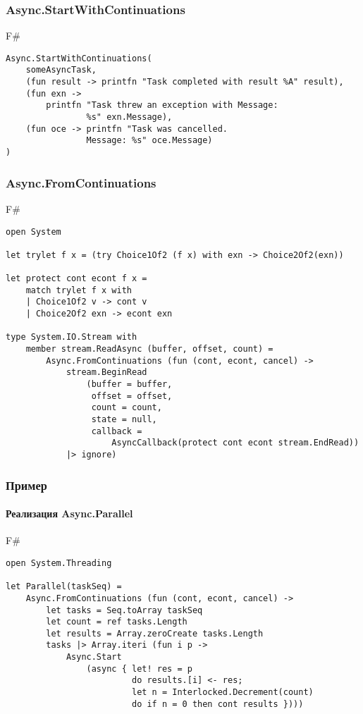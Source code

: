 \documentclass[xetex,mathserif,serif]{beamer}
\begin{document}
	\begin{frame}[fragile]
		\frametitle{Async.StartWithContinuations}
		\begin{exampleblock}{F\#}
			\begin{verbatim}
Async.StartWithContinuations(
    someAsyncTask,
    (fun result -> printfn "Task completed with result %A" result),
    (fun exn -> 
        printfn "Task threw an exception with Message: 
                %s" exn.Message),
    (fun oce -> printfn "Task was cancelled. 
                Message: %s" oce.Message)
)
		\end{verbatim}
		\end{exampleblock}
\end{frame}

	\begin{frame}[fragile]
		\frametitle{Async.FromContinuations}
		\begin{scriptsize}
			\begin{exampleblock}{F\#}
				\begin{verbatim}
open System

let trylet f x = (try Choice1Of2 (f x) with exn -> Choice2Of2(exn))

let protect cont econt f x =
    match trylet f x with
    | Choice1Of2 v -> cont v
    | Choice2Of2 exn -> econt exn

type System.IO.Stream with
    member stream.ReadAsync (buffer, offset, count) =
        Async.FromContinuations (fun (cont, econt, cancel) ->
            stream.BeginRead
                (buffer = buffer,
                 offset = offset,
                 count = count,
                 state = null,
                 callback = 
                     AsyncCallback(protect cont econt stream.EndRead))
            |> ignore)
				\end{verbatim}
			\end{exampleblock}
		\end{scriptsize}
\end{frame}

	\begin{frame}[fragile]
		\frametitle{Пример}
		\framesubtitle{Реализация Async.Parallel}
		\begin{exampleblock}{F\#}
			\begin{verbatim}
open System.Threading

let Parallel(taskSeq) =
    Async.FromContinuations (fun (cont, econt, cancel) ->
        let tasks = Seq.toArray taskSeq
        let count = ref tasks.Length
        let results = Array.zeroCreate tasks.Length
        tasks |> Array.iteri (fun i p ->
            Async.Start
                (async { let! res = p
                         do results.[i] <- res;
                         let n = Interlocked.Decrement(count)
                         do if n = 0 then cont results })))
			\end{verbatim}
		\end{exampleblock}
\end{frame}
\end{document}

